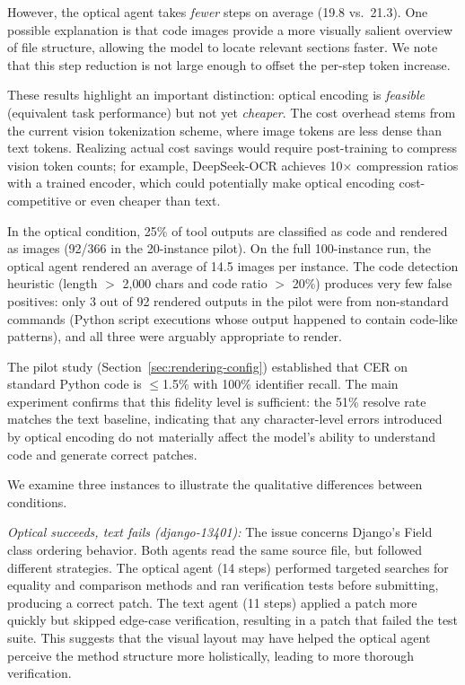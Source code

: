 However, the optical agent takes \emph{fewer} steps on average (19.8 vs.\ 21.3). One possible explanation is that code images provide a more visually salient overview of file structure, allowing the model to locate relevant sections faster. We note that this step reduction is not large enough to offset the per-step token increase.

These results highlight an important distinction: optical encoding is \emph{feasible} (equivalent task performance) but not yet \emph{cheaper}. The cost overhead stems from the current vision tokenization scheme, where image tokens are less dense than text tokens. Realizing actual cost savings would require post-training to compress vision token counts; for example, DeepSeek-OCR \cite{wei2025deepseekocr} achieves 10$\times$ compression ratios with a trained encoder, which could potentially make optical encoding cost-competitive or even cheaper than text.

In the optical condition, 25\% of tool outputs are classified as code and rendered as images (92/366 in the 20-instance pilot). On the full 100-instance run, the optical agent rendered an average of 14.5 images per instance. The code detection heuristic (length $>$ 2{,}000 chars and code ratio $>$ 20\%) produces very few false positives: only 3 out of 92 rendered outputs in the pilot were from non-standard commands (Python script executions whose output happened to contain code-like patterns), and all three were arguably appropriate to render.

The pilot study (Section~\ref{sec:rendering-config}) established that CER on standard Python code is $\le$1.5\% with 100\% identifier recall. The main experiment confirms that this fidelity level is sufficient: the 51\% resolve rate matches the text baseline, indicating that any character-level errors introduced by optical encoding do not materially affect the model's ability to understand code and generate correct patches.


We examine three instances to illustrate the qualitative differences between conditions.

\emph{Optical succeeds, text fails (django-13401):} The issue concerns Django's Field class ordering behavior. Both agents read the same source file, but followed different strategies. The optical agent (14 steps) performed targeted searches for equality and comparison methods and ran verification tests before submitting, producing a correct patch. The text agent (11 steps) applied a patch more quickly but skipped edge-case verification, resulting in a patch that failed the test suite. This suggests that the visual layout may have helped the optical agent perceive the method structure more holistically, leading to more thorough verification.

